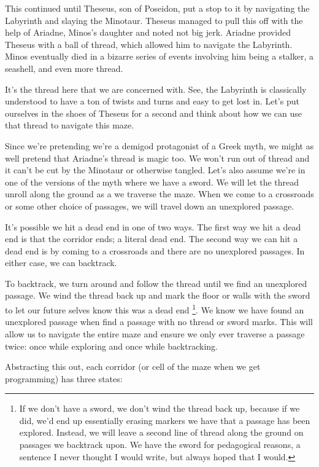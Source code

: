 This continued until Theseus, son of Poseidon, put a stop to it by navigating the Labyrinth and slaying the Minotaur. Theseus managed to pull this off with the help of Ariadne, Minos's daughter and noted not big jerk. Ariadne provided Theseus with a ball of thread, which allowed him to navigate the Labyrinth. Minos eventually died in a bizarre series of events involving him being a stalker, a seashell, and even more thread.

It's the thread here that we are concerned with.  See, the Labyrinth is classically understood to have a ton of twists and turns and easy to get lost in.  Let's put ourselves in the shoes of Theseus for a second and think about how we can use that thread to navigate this maze.  

Since we're pretending we're a demigod protagonist of a Greek myth, we might as well pretend that Ariadne's thread is magic too.  We won't run out of thread and it can't be cut by the Minotaur or otherwise tangled.  Let's also assume we're in one of the versions of the myth where we have a sword. We will let the thread unroll along the ground as a we traverse the maze.  When we come to a crossroads or some other choice of passages, we will travel down an unexplored passage.  


It's possible we hit a dead end in one of two ways.  The first way we hit a dead end is that the corridor ends;  a literal dead end.  The second way we can hit a dead end is by coming to a crossroads and there are no unexplored passages.  In either case, we can backtrack.

To backtrack, we turn around and follow the thread until we find an unexplored passage.  We wind the thread back up and mark the floor or walls with the sword to let our future selves know this was a dead end \footnote{If we don't have a sword, we don't wind the thread back up, because if we did, we'd end up essentially erasing markers we have that a passage has been explored. Instead, we will leave a second line of thread along the ground on passages we backtrack upon.  We have the sword for pedagogical reasons, a sentence I never thought I would write, but always hoped that I would.}. We know we have found an unexplored passage when find a passage with no thread or sword marks. This will allow us to navigate the entire maze and ensure we only ever traverse a passage twice:  once while exploring and once while backtracking.


Abstracting this out, each corridor (or cell of the maze when we get programming) has three states:

